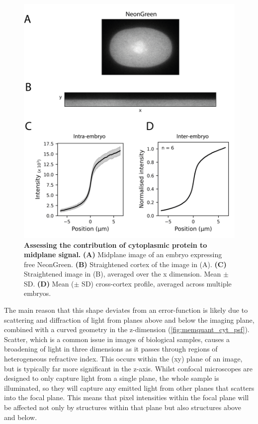 \documentclass[12pt]{"article"}
\newcommand{\mycaption}[2]{\caption[#1]{\textbf{#1.} #2}}
\begin{document}
\begin{figure}
\includegraphics[scale=1]{memquant_cyt_profile}
\centering
\mycaption{Assessing the contribution of cytoplasmic protein to midplane signal}{
\textbf{(A)} Midplane image of an embryo expressing free NeonGreen.
\textbf{(B)} Straightened cortex of the image in (A).
\textbf{(C)} Straightened image in (B), averaged over the x dimension. Mean $\pm$ SD.
\textbf{(D)} Mean ($\pm$ SD) cross-cortex profile, averaged across multiple embryos.
}
\label{fig:memquant_cyt_profile}
\end{figure}

The main reason that this shape deviates from an error-function is likely due to scattering and diffraction of light from planes above and below the imaging plane, combined with a curved geometry in the z-dimension (\cref{fig:memquant_cyt_psf}). Scatter, which is a common issue in images of biological samples, causes a broadening of light in three dimensions as it passes through regions of heterogeneous refractive index. This occurs within the (xy) plane of an image, but is typically far more significant in the z-axis. Whilst confocal microscopes are designed to only capture light from a single plane, the whole sample is illuminated, so they will capture any emitted light from other planes that scatters into the focal plane. This means that pixel intensities within the focal plane will be affected not only by structures within that plane but also structures above and below.\\
\end{document}
